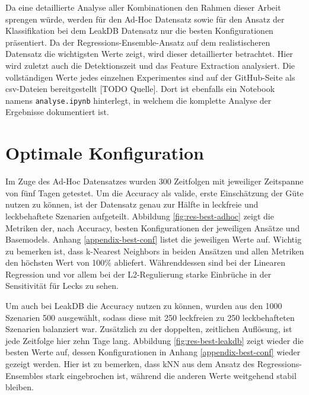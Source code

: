 Da eine detaillierte Analyse aller Kombinationen den Rahmen dieser Arbeit sprengen würde, werden für den
 Ad-Hoc Datensatz sowie für den Ansatz der Klassifikation bei dem LeakDB Datensatz nur die besten Konfigurationen
 präsentiert. Da der Regressions-Ensemble-Ansatz auf dem realistischeren Datensatz die wichtigsten Werte zeigt,
 wird dieser detaillierter betrachtet. Hier wird zuletzt auch die Detektionszeit und das Feature Extraction
 analysiert. Die vollständigen Werte jedes einzelnen Experimentes sind auf der GitHub-Seite als csv-Dateien
 bereitgestellt [TODO Quelle]. Dort ist ebenfalls ein Notebook namens \texttt{analyse.ipynb} hinterlegt, in welchem
 die komplette Analyse der Ergebnisse dokumentiert ist.

\section{Optimale Konfiguration}

Im Zuge des Ad-Hoc Datensatzes wurden 300 Zeitfolgen mit jeweiliger Zeitspanne von fünf Tagen getestet. Um die
 Accuracy als valide, erste Einschätzung der Güte nutzen zu können, ist der Datensatz genau zur Hälfte in
 leckfreie und leckbehaftete Szenarien aufgeteilt. Abbildung \ref{fig:res-best-adhoc} zeigt die Metriken der, nach
 Accuracy, besten Konfigurationen der jeweiligen Ansätze und Basemodels. Anhang \ref{appendix-best-conf} listet
 die jeweiligen Werte auf. Wichtig zu bemerken ist, dass k-Nearest Neighbors in beiden Ansätzen und allen Metriken
 den höchsten Wert von 100\% abliefert. Währenddessen sind bei der Linearen Regression und vor allem bei der
 L2-Regulierung starke Einbrüche in der Sensitivität für Lecks zu sehen.

Um auch bei LeakDB die Accuracy nutzen zu können, wurden aus den 1000 Szenarien 500 ausgewählt, sodass diese
 mit 250 leckfreien zu 250 leckbehafteten Szenarien balanziert war. Zusätzlich zu der doppelten, zeitlichen
 Auflösung, ist jede Zeitfolge hier zehn Tage lang. Abbildung \ref{fig:res-best-leakdb} zeigt wieder die besten
 Werte auf, dessen Konfigurationen in Anhang \ref{appendix-best-conf} wieder gezeigt werden. Hier ist zu bemerken,
 dass kNN aus dem Ansatz des Regressions-Ensembles stark eingebrochen ist, während die anderen Werte weitgehend
 stabil bleiben.

